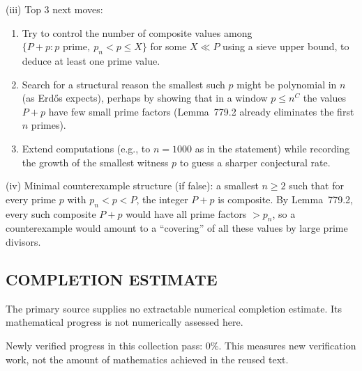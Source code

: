 (iii) Top 3 next moves:
\begin{enumerate}
\item Try to control the number of composite values among $\{P+p: p\text{ prime},\ p_n<p\le X\}$ for some $X\ll P$ using a sieve upper bound, to deduce at least one prime value.
\item Search for a structural reason the smallest such $p$ might be polynomial in $n$ (as Erd\H{o}s expects), perhaps by showing that in a window $p\le n^C$ the values $P+p$ have few small prime factors (Lemma~779.2 already eliminates the first $n$ primes).
\item Extend computations (e.g., to $n=1000$ as in the statement) while recording the growth of the smallest witness $p$ to guess a sharper conjectural rate.
\end{enumerate}

(iv) Minimal counterexample structure (if false): a smallest $n\ge 2$ such that for every prime $p$ with $p_n<p<P$, the integer $P+p$ is composite. By Lemma~779.2, every such composite $P+p$ would have all prime factors $>p_n$, so a counterexample would amount to a ``covering'' of all these values by large prime divisors.


\subsection*{COMPLETION ESTIMATE}
The primary source supplies no extractable numerical completion estimate. Its mathematical progress is not numerically assessed here.

Newly verified progress in this collection pass: $0\%$. This measures new verification work, not the amount of mathematics achieved in the reused text.
